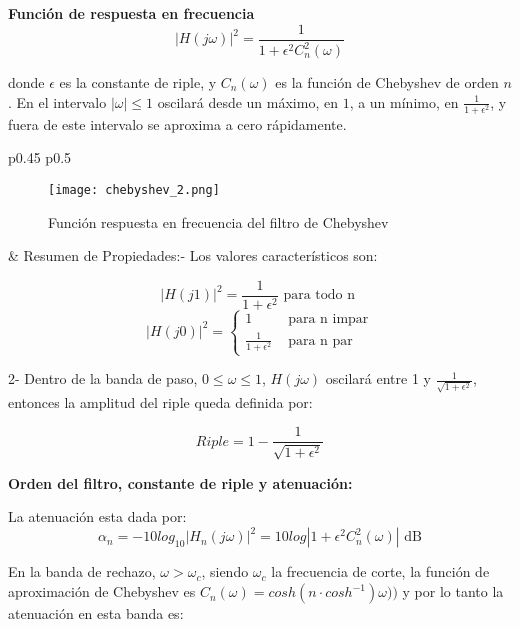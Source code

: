 \documentclass[informe.tex]{subfiles}
\begin{document}
\textbf{Función de respuesta en frecuencia}\newline	
		\[ \left| H(j\omega) \right|^2 = \frac{1}{ 1 +  \epsilon^2 C_n^2(\omega)  } \]
		
donde $\epsilon$ es la constante de riple, y $C_n(\omega)$ es la función de Chebyshev de orden $n$. En el intervalo  $ \left| \omega \right| \le 1 $ oscilará desde un máximo, en $1$, a un mínimo, en $ \frac{1}{1+\epsilon^2} $, y fuera de este intervalo se aproxima a cero rápidamente.\\

	\begin{tabular}{p{0.45\textwidth} p{0.5\textwidth}}		
			
		\begin{wrapfigure}{l}{0.9\linewidth}
		\centering
		\texttt{[image: chebyshev\_2.png]}
		\caption{Función respuesta en frecuencia del filtro de Chebyshev}
		\end{wrapfigure}				
		&
		Resumen de Propiedades:- Los valores característicos son: 
		
			\[ \left| H(j1) \right|^2 = \frac{1}{1 + \epsilon^2} \mbox{ para todo n }  \] 
			\[ |H(j0)|^2 = \begin{cases}
							1 & \mbox{ para n impar} \\
				            \frac{1}{1+\epsilon^2} & \mbox{ para n par}
							\end{cases}  \]
			
			2- Dentro de la banda de paso, $ 0 \le \omega \le 1 $, $ H(j\omega)$ oscilará entre 1 y $\frac{1}{\sqrt{1+\epsilon^2}}$, entonces la amplitud del riple queda definida por: 
			
				\[ 
					Riple = 1 - \frac{1}{\sqrt{1 + \epsilon^2}}
				 \]			
		\end{tabular} \newline
	
\textbf{Orden del filtro, constante de riple y atenuación:}\newline	
	
La atenuación esta dada por:  $$ \alpha_n = -10 log_{10} \left| H_n(j\omega) \right|^2 = 10 log \left| 1 + \epsilon^2 C_n^2(\omega) \right| \mbox{ dB}$$ \newline                      

En la banda de rechazo, $ \omega>\omega_c $, siendo $\omega_c$ la frecuencia de corte, la función de aproximación de Chebyshev es $C_n(\omega)=cosh(n \cdot cosh^{-1}) \omega)) $ y por lo tanto la atenuación en esta banda es:
	
\end{document}
